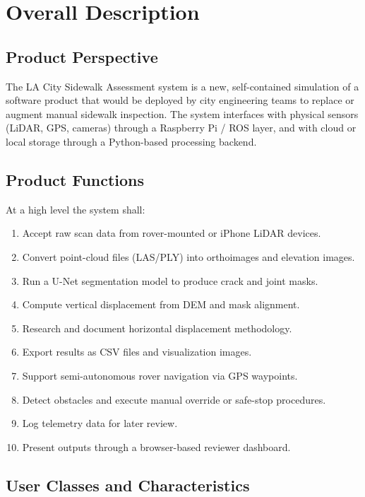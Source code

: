 \documentclass{article}
\begin{document}
\section{Overall Description}
\label{sec:overall}

\subsection{Product Perspective}
The LA City Sidewalk Assessment system is a new, self-contained simulation of a software product
that would be deployed by city engineering teams to replace or augment manual sidewalk inspection.
The system interfaces with physical sensors (LiDAR, GPS, cameras) through a Raspberry Pi / ROS
layer, and with cloud or local storage through a Python-based processing backend.

\subsection{Product Functions}
At a high level the system shall:
\begin{enumerate}
  \item Accept raw scan data from rover-mounted or iPhone LiDAR devices.
  \item Convert point-cloud files (LAS/PLY) into orthoimages and elevation images.
  \item Run a U-Net segmentation model to produce crack and joint masks.
  \item Compute vertical displacement from DEM and mask alignment.
  \item Research and document horizontal displacement methodology.
  \item Export results as CSV files and visualization images.
  \item Support semi-autonomous rover navigation via GPS waypoints.
  \item Detect obstacles and execute manual override or safe-stop procedures.
  \item Log telemetry data for later review.
  \item Present outputs through a browser-based reviewer dashboard.
\end{enumerate}

\subsection{User Classes and Characteristics}
\end{document}

